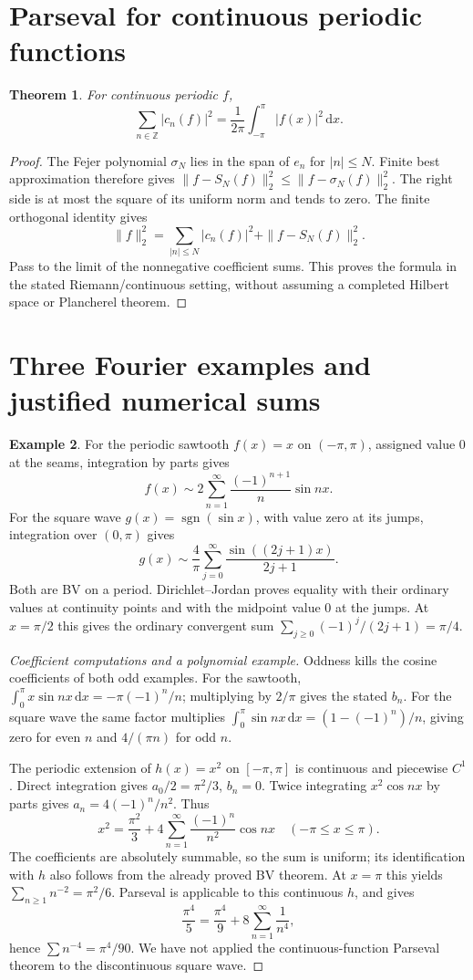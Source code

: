 \documentclass[11pt,oneside,a4paper]{book}
\newtheorem{theorem}{Theorem}[chapter]
\theoremstyle{definition}
\newtheorem{example}[theorem]{Example}
\theoremstyle{remark}
\newcommand{\Z}{\mathbb Z}
\newcommand{\dd}{\,\mathrm d}
\newcommand{\KEntry}[2]{\Needspace{7\baselineskip}\section{#2}\label{#1}{\small\sffamily\color{black!60}\detokenize{#1}}\par}
\begin{document}
\KEntry{K03.19.parseval}{Parseval for continuous periodic functions}
\begin{theorem}
For continuous periodic $f$,
\[
 \sum_{n\in\Z}|c_n(f)|^2=\frac1{2\pi}\int_{-\pi}^{\pi}|f(x)|^2\dd x.
\]
\end{theorem}
\begin{proof}
The Fejer polynomial $\sigma_N$ lies in the span of $e_n$ for $|n|\leq N$.
Finite best approximation therefore gives
$\|f-S_N(f)\|_2^2\leq\|f-\sigma_N(f)\|_2^2$.
The right side is at most the square of its uniform norm and tends to zero.
The finite orthogonal identity gives
\[
 \|f\|_2^2=\sum_{|n|\leq N}|c_n(f)|^2+\|f-S_N(f)\|_2^2.
\]
Pass to the limit of the nonnegative coefficient sums. This proves the
formula in the stated Riemann/continuous setting, without assuming a
completed Hilbert space or Plancherel theorem.
\end{proof}

\KEntry{K03.19.examples}{Three Fourier examples and justified numerical sums}
\begin{example}
For the periodic sawtooth $f(x)=x$ on $(-\pi,\pi)$, assigned value $0$
at the seams, integration by parts gives
\[
 f(x)\sim2\sum_{n=1}^\infty\frac{(-1)^{n+1}}n\sin nx.
\]
For the square wave $g(x)=\operatorname{sgn}(\sin x)$, with value zero at
its jumps, integration over $(0,\pi)$ gives
\[
 g(x)\sim\frac4\pi\sum_{j=0}^\infty\frac{\sin((2j+1)x)}{2j+1}.
\]
Both are BV on a period. Dirichlet--Jordan proves equality with their
ordinary values at continuity points and with the midpoint value $0$ at
the jumps. At $x=\pi/2$ this gives the ordinary convergent sum
$\sum_{j\geq0}(-1)^j/(2j+1)=\pi/4$.
\end{example}
\begin{proof}[Coefficient computations and a polynomial example]
Oddness kills the cosine coefficients of both odd examples. For the
sawtooth,
$\int_0^\pi x\sin nx\dd x=-\pi(-1)^n/n$; multiplying by $2/\pi$ gives
the stated $b_n$. For the square wave the same factor multiplies
$\int_0^\pi\sin nx\dd x=(1-(-1)^n)/n$, giving zero for even $n$ and
$4/(\pi n)$ for odd $n$.

The periodic extension of $h(x)=x^2$ on $[-\pi,\pi]$ is continuous
and piecewise $C^1$. Direct integration gives $a_0/2=\pi^2/3$, $b_n=0$.
Twice integrating $x^2\cos nx$ by parts gives
$a_n=4(-1)^n/n^2$. Thus
\[
 x^2=\frac{\pi^2}3+4\sum_{n=1}^\infty\frac{(-1)^n}{n^2}\cos nx
 \quad(-\pi\leq x\leq\pi).
\]
The coefficients are absolutely summable, so the sum is uniform; its
identification with $h$ also follows from the already proved BV theorem.
At $x=\pi$ this yields $\sum_{n\geq1}n^{-2}=\pi^2/6$.
Parseval is applicable to this continuous $h$, and gives
\[
 \frac{\pi^4}{5}=\frac{\pi^4}{9}
                 +8\sum_{n=1}^\infty\frac1{n^4},
\]
hence $\sum n^{-4}=\pi^4/90$. We have not applied the
continuous-function Parseval theorem to the discontinuous square wave.
\end{proof}
\end{document}
